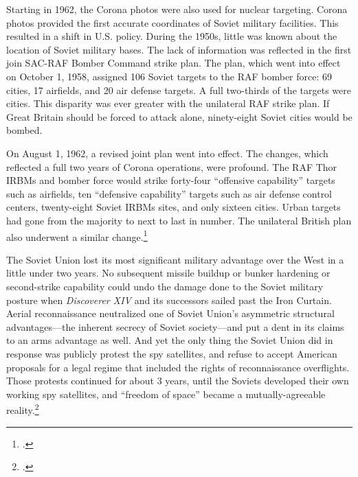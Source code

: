 \documentclass[12pt]{extarticle}
\begin{document}
\begin{quoteblock}
Starting in 1962, the Corona photos were also used for nuclear targeting. Corona photos provided the first accurate coordinates of Soviet military facilities. This resulted in a shift in U.S. policy. During the 1950s, little was known about the location of Soviet military bases. The lack of information was reflected in the first join SAC-RAF Bomber Command strike plan. The plan, which went into effect on October 1, 1958, assigned 106 Soviet targets to the RAF bomber force: 69 cities, 17 airfields, and 20 air defense targets. A full two-thirds of the targets were cities. This disparity was ever greater with the unilateral RAF strike plan. If Great Britain should be forced to attack alone, ninety-eight Soviet cities would be bombed.

On August 1, 1962, a revised joint plan went into effect. The changes, which reflected a full two years of Corona operations, were profound. The RAF Thor IRBMs and bomber force would strike forty-four ``offensive capability'' targets such as airfields, ten ``defensive capability'' targets such as air defense control centers, twenty-eight Soviet IRBMs sites, and only sixteen cities. Urban targets had gone from the majority to next to last in number. The unilateral British plan also underwent a similar change.\footcite[139]{peebles_corona_1997}
\end{quoteblock}

The Soviet Union lost its most significant military advantage over the West in a little under two years. No subsequent missile buildup or bunker hardening or second-strike capability could undo the damage done to the Soviet military posture when \emph{Discoverer XIV} and its successors sailed past the Iron Curtain. Aerial reconnaissance neutralized one of Soviet Union's asymmetric structural advantages---the inherent secrecy of Soviet society---and put a dent in its claims to an arms advantage as well. And yet the only thing the Soviet Union did in response was publicly protest the spy satellites, and refuse to accept American proposals for a legal regime that included the rights of reconnaissance overflights. Those protests continued for about 3 years, until the Soviets developed their own working spy satellites, and ``freedom of space'' became a mutually-agreeable reality.\footcite[271-275]{mcdougall_heavens_1985}
\end{document}
